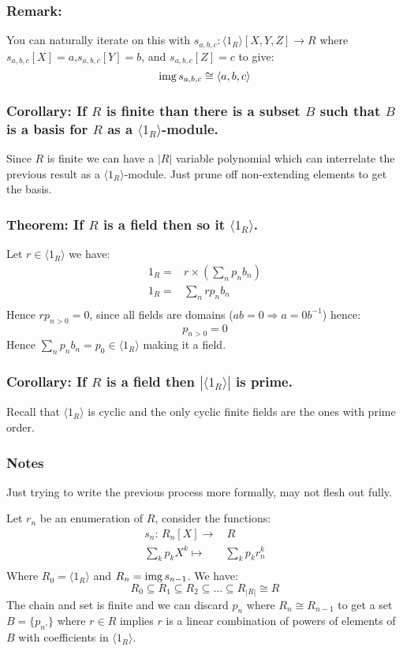 \subsubsection{Remark:}
You can naturally iterate on this with $s_{a,b,c}: \langle 1_R \rangle[X,Y,Z] \rightarrow R$ where $s_{a,b,c}[X] = a$,$s_{a,b,c}[Y] = b$, and $s_{a,b,c}[Z] = c$ to give:
\[\operatorname{img} s_{a,b,c} \cong \langle a,b,c \rangle\]

\subsubsection{Corollary: If $R$ is finite than there is a subset $B$ such that $B$ is a basis for $R$ as a $\langle 1_R \rangle$-module.}
Since $R$ is finite we can have a $|R|$ variable polynomial which can interrelate the previous result as a $\langle 1_R \rangle$-module.
Just prune off non-extending elements to get the basis.

\subsubsection{Theorem: If $R$ is a field then so it $\langle 1_R \rangle$.}
Let $r\in\langle 1_R \rangle$ we have:
\begin{equation*}
\begin{aligned}
	1_R =& r\times\left(\sum_np_nb_n\right)\\
	1_R =& \sum_nrp_nb_n\\
\end{aligned}
\end{equation*}
Hence $rp_{n>0} = 0$, 
since all fields are domains ($ab=0\Rightarrow a=0b^{-1}$) hence:
\[p_{n>0} = 0\]
Hence $\sum_np_nb_n = p_0 \in \langle 1_R \rangle$ making it a field.

\subsubsection{Corollary: If $R$ is a field then $|\langle 1_R \rangle|$ is prime.}
Recall that $\langle 1_R \rangle$ is cyclic and the only cyclic finite fields are the ones with prime order.

\subsubsection{Notes}
Just trying to write the previous process more formally, 
may not flesh out fully.

Let $r_n$ be an enumeration of $R$, 
consider the functions:
\begin{equation*}
\begin{aligned}
	s_n:\,R_n[X]\longrightarrow&\, R\\
	\sum_kp_kX^k\mapsto& \sum_kp_kr^k_n \\
\end{aligned}
\end{equation*}
Where $R_0 =\langle 1_R \rangle$ and $R_n = \operatorname{img} s_{n-1}$.
We have:
\[R_0 \subseteq R_1 \subseteq R_2 \subseteq \dots \subseteq R_{|R|} \cong R\]
The chain and set is finite and we can discard $p_n$ where $R_{n} \cong R_{n-1}$ to get a set $B=\{p_{n'}\}$ where $r\in R$ implies $r$ is a linear combination of powers of elements of $B$ with coefficients in $\langle 1_R \rangle$.

